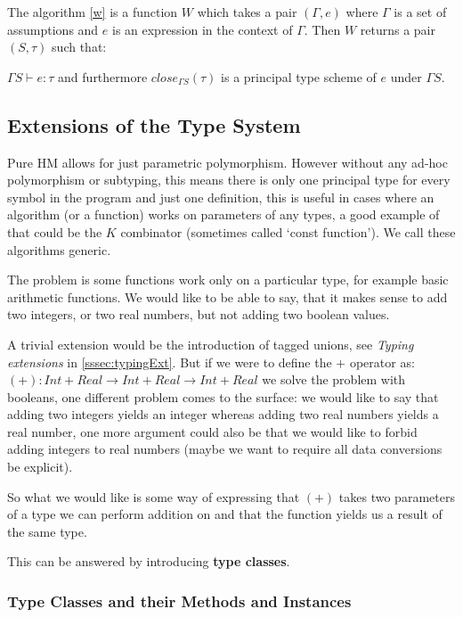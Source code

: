The algorithm \ref{w} is a function $W$ which takes a pair $(\Gamma, e)$ where $\Gamma$ is a set of assumptions and $e$ is an expression in the context of $\Gamma$. Then $W$ returns a pair $(S, \tau)$ such that:

$\Gamma S \vdash e : \tau$ and furthermore $close_{\Gamma S}(\tau)$ is a principal type scheme of $e$ under $\Gamma S$.

\subsection{Extensions of the Type System}

Pure HM allows for just parametric polymorphism. However without any ad-hoc polymorphism or subtyping, this means there is only one principal type for every symbol in the program and just one definition, this is useful in cases where an algorithm (or a function) works on parameters of any types, a good example of that could be the $K$ combinator (sometimes called `const function'). We call these algorithms generic.

The problem is some functions work only on a particular type, for example basic arithmetic functions. We would like to be able to say, that it makes sense to add two integers, or two real numbers, but not adding two boolean values.

A trivial extension would be the introduction of tagged unions, see \emph{Typing extensions} in \ref{sssec:typingExt}. But if we were to define the $+$ operator as: $(+) : Int + Real \rightarrow Int + Real \rightarrow Int + Real$ we solve the problem with booleans, one different problem comes to the surface: we would like to say that adding two integers yields an integer whereas adding two real numbers yields a real number, one more argument could also be that we would like to forbid adding integers to real numbers (maybe we want to require all data conversions be explicit).

So what we would like is some way of expressing that $(+)$ takes two parameters of a type we can perform addition on and that the function yields us a result of the same type.

This can be answered by introducing \textbf{type classes}.

\subsubsection{Type Classes and their Methods and Instances}

